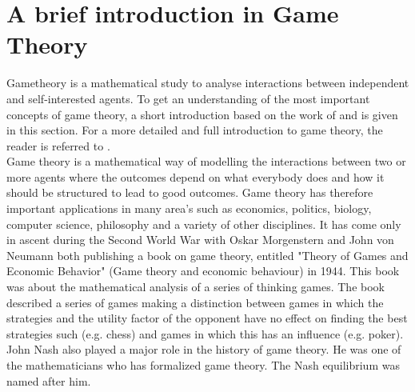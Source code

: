 \section{A brief introduction in Game Theory}
\label{Cha1:briefintro}
Gametheory is a mathematical study to analyse interactions between independent and self-interested agents. To get an understanding of the most important concepts of game theory, a short introduction based on the work of 
\cite{leyton2008essentials} and \cite{Coursera} is given in this section. For a more detailed and full introduction to game theory, the reader is referred to 
\cite{leyton2008essentials}.  \\
Game theory is a mathematical way of modelling the interactions between two or more agents where the outcomes depend on what everybody does and how it should be structured to lead to good outcomes. Game theory has therefore important applications in many area's such as economics, politics, biology, computer science, philosophy and a variety of other disciplines. It has come only in ascent during the Second World War with Oskar Morgenstern and John von Neumann both publishing a book on game theory, entitled "Theory of Games and Economic Behavior" (Game theory and economic behaviour) in 1944. This book was about the mathematical analysis of a series of thinking games. The book described a series of games making a distinction between games in which the strategies and the utility factor of the opponent have no effect on finding the best strategies such (e.g. chess) and games in which this has an influence (e.g. poker). John Nash also played a major role in the history of game theory. He was one of the mathematicians who has formalized game theory. The Nash equilibrium was named after him.
~~\\

